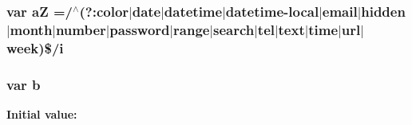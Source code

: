 \subsubsection[{a\-Z}]{\setlength{\rightskip}{0pt plus 5cm}var a\-Z =/$^\wedge$(?\-:color$\vert$date$\vert$datetime$\vert$datetime-\/local$\vert$email$\vert$hidden$\vert$month$\vert$number$\vert$password$\vert$range$\vert$search$\vert$tel$\vert$text$\vert$time$\vert$url$\vert$week)\$/i}\label{data_structures_2html_2jquery_8js_ac87125cdee1a5e57da4ef619af49bc7d}
\subsubsection[{b}]{\setlength{\rightskip}{0pt plus 5cm}var b}\label{data_structures_2html_2jquery_8js_aa4026ad5544b958e54ce5e106fa1c805}
{\bfseries Initial value\-:}
